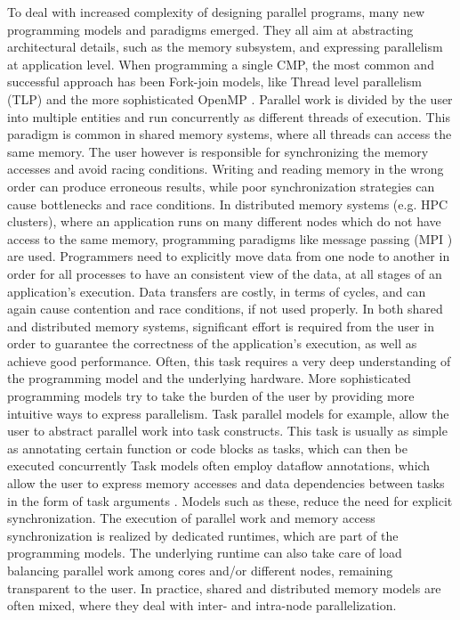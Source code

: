To deal with increased complexity of designing parallel programs, many new programming
models and paradigms emerged.  They all aim at abstracting architectural details, such as
the memory subsystem, and expressing parallelism at application level.  When programming a
single CMP, the most common and successful approach has been Fork-join models, like Thread
level parallelism (TLP) and the more sophisticated OpenMP \cite{openmp13}.  Parallel work
is divided by the user into multiple entities and run concurrently as different threads of
execution.  This paradigm is common in shared memory systems, where all threads can access
the same memory.  The user however is responsible for synchronizing the memory accesses
and avoid racing conditions.  Writing and reading memory in the wrong order can produce
erroneous results, while poor synchronization strategies can cause bottlenecks and race
conditions.  In distributed memory systems (e.g. HPC clusters), where an application runs
on many different nodes which do not have access to the same memory, programming paradigms
like message passing (MPI \cite{Nagle:2005:MCR:1239662.1239666}) are used.  Programmers
need to explicitly move data from one node to another in order for all processes to have
an consistent view of the data, at all stages of an application's execution.  Data
transfers are costly, in terms of cycles, and can again cause contention and race
conditions, if not used properly.  In both shared and distributed memory systems,
significant effort is required from the user in order to guarantee the correctness of the
application's execution, as well as achieve good performance.  Often, this task requires a
very deep understanding of the programming model and the underlying hardware.  More
sophisticated programming models try to take the burden of the user by providing more
intuitive ways to express parallelism.  Task parallel models for example, allow the user
to abstract parallel work into task constructs.  This task is usually as simple as
annotating certain function or code blocks as tasks, which can then be executed
concurrently
\cite{Fatahalian:2006:SPM:1188455.1188543,Blumofe1995,Bellens:SC2006,Ayguade:2009:DOT:1512157.1512430,Tzenakis:2012:BBD:2370036.2145864,Jenista:2011:OSO:2038037.1941563,Planas:2009:HTP:1572226.1572233,Duran:PPL2011}
Task models often employ dataflow annotations, which allow the user to express memory
accesses and data dependencies between tasks in the form of task arguments
\cite{Jenista:2011:OSO:2038037.1941563,Ayguade:2009:DOT:1512157.1512430,Tzenakis:2012:BBD:2370036.2145864,Duran:PPL2011}.
Models such as these, reduce the need for explicit synchronization.  The execution of
parallel work and memory access synchronization is realized by dedicated runtimes, which
are part of the programming models.  The underlying runtime can also take care of load
balancing parallel work among cores and/or different nodes, remaining transparent to the
user.  In practice, shared and distributed memory models are often mixed, where they deal
with inter- and intra-node parallelization. 


